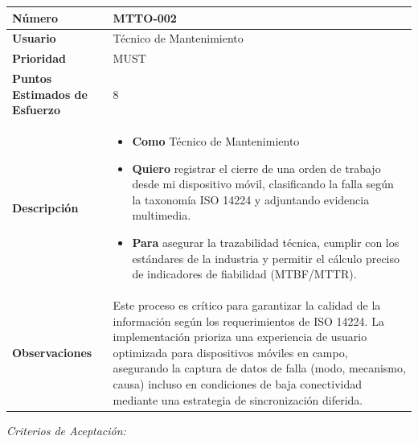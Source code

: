 \begin{longtable}{|p{0.21\textwidth}|p{0.74\textwidth}|}\hline
\textbf{Número} & MTTO-002 \\ \hline
\textbf{Usuario} & Técnico de Mantenimiento \\ \hline
\textbf{Prioridad} & MUST \\ \hline
\textbf{Puntos Estimados de Esfuerzo} & 8 \\ \hline
\textbf{Descripción} & \parbox[t]{\linewidth}{\vspace{2pt}\begin{itemize}[leftmargin=1.5em, nosep, topsep=0pt]
\item \textbf{Como} Técnico de Mantenimiento
\item \textbf{Quiero} registrar el cierre de una orden de trabajo desde mi dispositivo móvil, clasificando la falla según la taxonomía ISO 14224 y adjuntando evidencia multimedia.
\item \textbf{Para} asegurar la trazabilidad técnica, cumplir con los estándares de la industria y permitir el cálculo preciso de indicadores de fiabilidad (MTBF/MTTR).
\end{itemize}\vspace{2pt}} \\ \hline
\textbf{Observaciones} & Este proceso es crítico para garantizar la calidad de la información según los requerimientos de ISO 14224. La implementación prioriza una experiencia de usuario optimizada para dispositivos móviles en campo, asegurando la captura de datos de falla (modo, mecanismo, causa) incluso en condiciones de baja conectividad mediante una estrategia de sincronización diferida. \\ \hline
\end{longtable}\normalsize
\noindent\textit{Criterios de Aceptación:}
